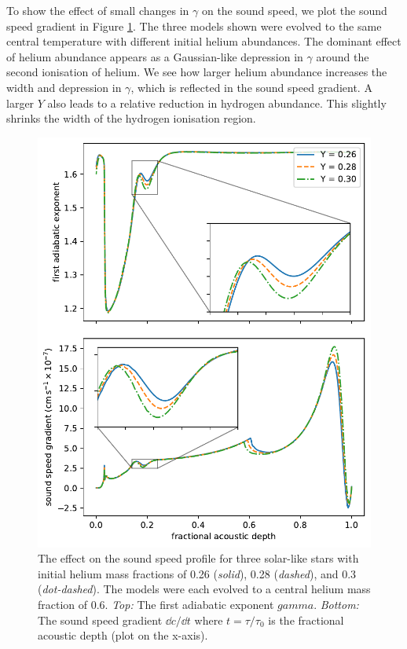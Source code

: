 To show the effect of small changes in \(\gamma\) on the sound speed, we plot the sound speed gradient in Figure \ref{fig:gamma-sound-speed}. The three models shown were evolved to the same central temperature with different initial helium abundances. The dominant effect of helium abundance appears as a Gaussian-like depression in \(\gamma\) around the second ionisation of helium. We see how larger helium abundance increases the width and depression in \(\gamma\), which is reflected in the sound speed gradient. A larger \(Y\) also leads to a relative reduction in hydrogen abundance. This slightly shrinks the width of the hydrogen ionisation region.

\begin{figure}
    \centering
    \includegraphics{figures/helium-ionisation-sound-speed.pdf}
    \caption{The effect on the sound speed profile for three solar-like stars with initial helium mass fractions of 0.26 (\emph{solid}), 0.28 (\emph{dashed}), and 0.3 (\emph{dot-dashed}). The models were each evolved to a central helium mass fraction of 0.6. \emph{Top:} The first adiabatic exponent \(gamma\). \emph{Bottom:} The sound speed gradient \(\dd c/\dd t\) where \(t = \tau/\tau_0\) is the fractional acoustic depth (plot on the x-axis).}
    \label{fig:gamma-sound-speed}
\end{figure}


